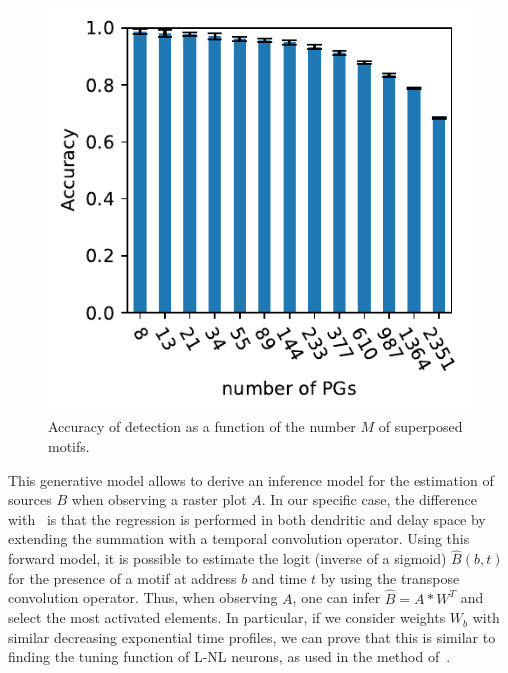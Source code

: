 \documentclass[11pt]{article}
\begin{document}
\begin{figure}
%
\includegraphics[width=\linewidth]{figure_N_PGs.pdf}
\vspace{-25pt}
{
\caption{Accuracy of detection as a function of the number $M$ of superposed motifs.
}
\label{fig:2}
}
\end{figure}
This generative model allows to derive an inference model for the estimation of sources $B$ when observing a raster plot $A$. 
In our specific case, the difference with~\parencite{russo_cell_2017, stella_3d-spade_2019} is that the regression is performed in both dendritic and delay space by extending the summation with a temporal convolution operator. Using this forward model, it is possible to estimate the logit (inverse of a sigmoid) $\hat{B}(b, t)$ for the presence of a motif at address $b$ and time $t$ by using the transpose convolution operator. Thus, when observing $A$, one can infer $\hat{B} = A \ast W^T$ and select the most activated elements. In particular, if we consider weights $W_b$ with similar decreasing exponential time profiles, we can prove that this is similar to finding the tuning function of L-NL neurons, as used in the method of~\parencite{berens_fast_2012}.
\end{document}
